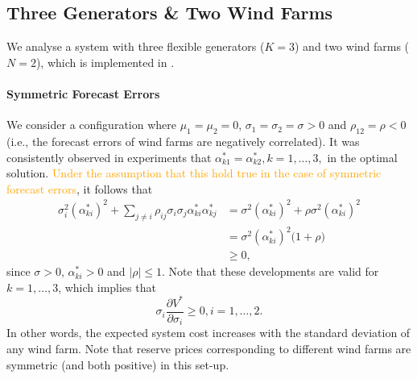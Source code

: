 \documentclass{article}
\begin{document}
\subsection{Three Generators \& Two Wind Farms}

We analyse a system with three flexible generators ($K = 3$) and two wind farms ($N = 2$), which is implemented in \cite{SMER2022}. 

\paragraph{Symmetric Forecast Errors} We consider a configuration where $\mu_1 = \mu_2 = 0$, $\sigma_1 = \sigma_2 = \sigma > 0$ and $\rho_{12} = \rho < 0$ (i.e., the forecast errors of wind farms are negatively correlated). It was consistently observed in experiments that $\alpha_{k1}^* = \alpha_{k2}^*, k = 1, \ldots, 3,$ in the optimal solution. \textcolor{orange}{Under the assumption that this hold true in the case of symmetric forecast errors}, it follows that
\begin{align*}
\sigma_i^2 (\alpha_{ki}^*)^2 + \sum_{j \ne i} \rho_{ij} \sigma_i \sigma_j \alpha_{ki}^* \alpha_{kj}^* &= \sigma^2 (\alpha_{ki}^*)^2 + \rho \sigma^2 (\alpha_{ki}^*)^2\\
&= \sigma^2 (\alpha_{ki}^*)^2 \big(1 + \rho\big)\\
&\ge 0,
\end{align*}
since $\sigma > 0$, $\alpha_{ki}^* > 0$ and $|\rho| \le 1$. Note that these developments are valid for $k = 1, \ldots, 3$, which implies that 
\begin{equation*}
\sigma_i \frac{\partial V^*}{\partial \sigma_i} \ge 0, i = 1, \ldots, 2.
\end{equation*}
In other words, the expected system cost increases with the standard deviation of any wind farm. Note that reserve prices corresponding to different wind farms are symmetric (and both positive) in this set-up.
\end{document}
